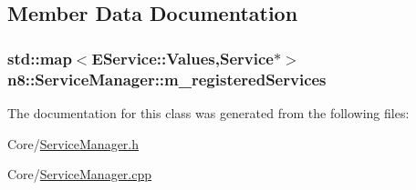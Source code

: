 \subsection{Member Data Documentation}
\hypertarget{classn8_1_1_service_manager_a631c25768aaa053b06aa519fc8a00d65}{
\subsubsection[{m\-\_\-registered\-Services}]{\setlength{\rightskip}{0pt plus 5cm}std\-::map$<${\bf E\-Service\-::\-Values},{\bf Service}$\ast$$>$ n8\-::\-Service\-Manager\-::m\-\_\-registered\-Services\hspace{0.3cm}{\ttfamily [private]}}}\label{classn8_1_1_service_manager_a631c25768aaa053b06aa519fc8a00d65}


The documentation for this class was generated from the following files\-:\begin{DoxyCompactItemize}
\item 
Core/\hyperlink{_service_manager_8h}{Service\-Manager.\-h}\item 
Core/\hyperlink{_service_manager_8cpp}{Service\-Manager.\-cpp}\end{DoxyCompactItemize}

